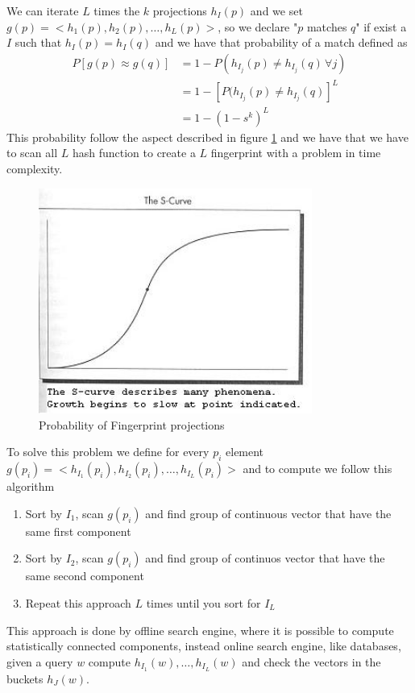 \begin{enumerate}
	      We can iterate $L$ times the $k$ projections $h_I(p)$ and we set $g(p) = <h_1(p), h_2(p), \dots, h_L(p)>$, so we declare "$p$ matches $q$" if exist a $I$ such that
	      $h_I(p) = h_I(q)$ and we have that probability of a match defined as 
	       \begin{align}
		      P[g(p) \approx g(q)] & = 1 - P(h_{I_j}(p) \neq h_{I_j}(q) \, \forall j) \\
		                           & = 1 - [P(h_{I_j}(p) \neq h_{I_j}(q)]^L \\
					   & = 1 - (1 - s^k)^L 
	      \end{align} 
	      This probability follow the aspect described in figure \ref{img:matchesProb} and we have that we have to scan all $L$ hash function to create a $L$ fingerprint 
	      with a problem in time complexity.

	      \begin{figure}
		\includegraphics[width=0.8\textwidth]{Images/fingerprintProb}
		\caption{Probability of Fingerprint projections}
		\label{img:matchesProb}
	      \end{figure}

	      To solve this problem we define for every $p_i$ element $g(p_i) = <h_{I_1}(p_i), h_{I_2}(p_i), \dots, h_{I_L}(p_i)>$ and to compute we follow this algorithm
	     \begin{enumerate}
		\item Sort by $I_1$, scan $g(p_i)$ and find group of continuous vector that have the same first component
		\item Sort by $I_2$, scan $g(p_i)$ and find group of continuos vector that have the same second component
		\item Repeat this approach $L$ times until you sort for $I_L$
	     \end{enumerate}
	     This approach is done by offline search engine, where it is possible to compute statistically connected components, instead online search engine, like databases, 
	     given a query $w$ compute $h_{I_1}(w), \dots, h_{I_L}(w)$ and check the vectors in the buckets $h_J(w)$.


\end{enumerate}
